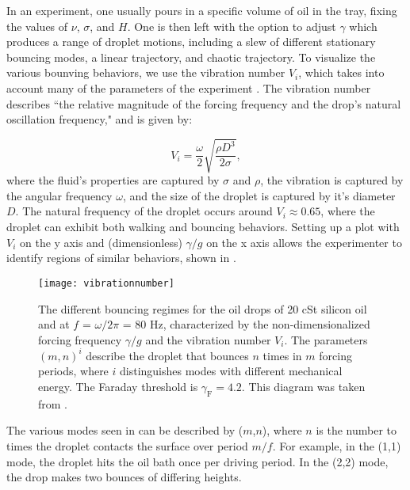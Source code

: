 In an experiment, one usually pours in a specific volume of oil in the tray, fixing the values of $\nu$, $\sigma$, and $H$. One is then left with the option to adjust $\gamma$ which produces a range of droplet motions, including a slew of different stationary bouncing modes, a linear trajectory,  and chaotic trajectory. To visualize the various bounving behaviors, we use the vibration number $V_i$, which takes into account many of the parameters of the experiment .  The vibration number describes ``the relative magnitude of the forcing frequency and the drop's natural oscillation frequency," and is given by:
	       	      
\begin{equation} \label{vibrationnumber}
V_i = \frac{\omega}{2}\sqrt{\frac{\rho D^3}{2\sigma}},
\end{equation}   	       	       
where the fluid's properties are captured by $\sigma$ and $\rho$, the vibration is captured by the angular frequency $\omega$, and the size of the droplet is captured by it's diameter $D$. The natural frequency of the droplet occurs around $V_i \approx 0.65$, where the droplet can exhibit both walking and bouncing behaviors. Setting up a plot with $V_i$ on the y axis and (dimensionless) ${\gamma}/{g}$ on the x axis allows the experimenter to identify regions of similar behaviors, shown in . 
	    
	    \begin{figure}[h]
	   
	       \centering
	    \texttt{[image: vibrationnumber]}
	     \caption{The different bouncing regimes for the oil drops of 20 cSt silicon oil and at $f$ = $\omega / 2\pi$ = 80 Hz, characterized by the non-dimensionalized forcing frequency $\gamma/g$ and the vibration number $V_i$. The parameters $(m,n)^{i}$ describe the droplet that bounces $n$ times in $m$ forcing periods, where $i$ distinguishes modes with different mechanical energy. The Faraday threshold is $\gamma_\mathrm{F} = 4.2$. This diagram was taken from .}
	 \label{regime}
	\end{figure}

The various modes seen in  can be described by ($m$,$n$), where $n$ is the number to times the droplet contacts the surface over period $m/f$. For example, in the (1,1) mode, the droplet hits the oil bath once per driving period. In the (2,2) mode, the drop makes two bounces of differing heights. 
	       
